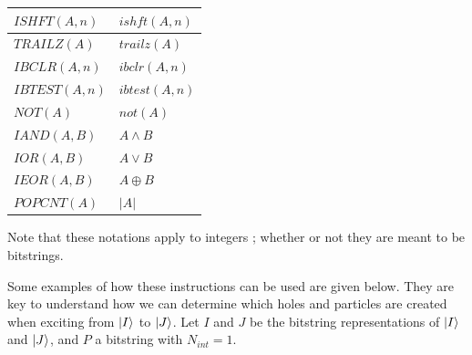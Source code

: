 \begin{table}[H]
	\begin{tabularx}{\textwidth}{X|X}
		\hline
		
		\hline
		\rule{0pt}{3ex}
		$ISHFT(A,n)$ & $ishft(A,n)$  \\ 
		
		\hline
		\rule{0pt}{3ex}
		$TRAILZ(A)$ & $trailz(A)$  \\ 
		
		\hline
		\rule{0pt}{3ex}
		$IBCLR(A,n)$ & $ibclr(A,n)$  \\ 
		
		\hline
		\rule{0pt}{3ex}
		$IBTEST(A,n)$ & $ibtest(A,n)$  \\ 
		
		\hline
		\rule{0pt}{3ex}
		$NOT(A)$ & $not(A)$  \\ 
		
		\hline
		\rule{0pt}{3ex}
		$IAND(A,B)$ & $A \wedge B$ \\
		
		\hline
		\rule{0pt}{3ex}
		$IOR(A,B)$ & $A \vee B$ \\
		
		\hline
		\rule{0pt}{3ex}
		$IEOR(A,B)$ & $A \oplus B$ \\
		
		\hline
		\rule{0pt}{3ex}
		$POPCNT(A)$ & $|A|$ \\
	\end{tabularx}
\end{table}

Note that these notations apply to integers ; whether or not they are meant to be bitstrings.



       
Some examples of how these instructions can be used are given below. They are key to understand how we can determine which holes and particles are created when exciting from $\ket I$ to $\ket J$.
Let $I$ and $J$ be the bitstring representations of $\ket I$ and $\ket J$, and $P$ a bitstring with $N_{int}=1$. 

      
      
